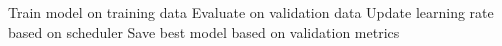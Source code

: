 \documentclass[a4paper,12pt]{article}
\begin{document}
\begin{algorithm}
\begin{algorithmic}[1]
                                        \State Train model on training data
                                        \State Evaluate on validation data
                                        \State Update learning rate based on scheduler
                                        \State Save best model based on validation metrics
                                    \EndFor
                                \EndFunction
                                \end{algorithmic}
                                \end{algorithm}
\end{document}
